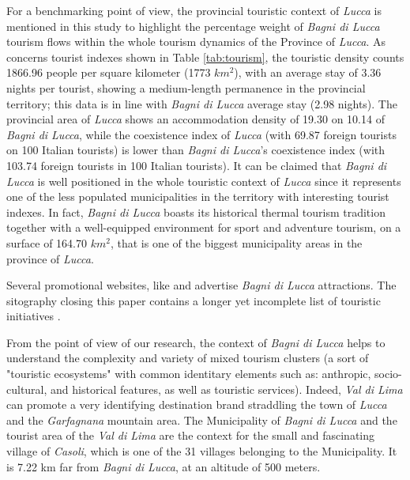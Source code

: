 \documentclass[sustainability,article,submit,pdftex,moreauthors]{Definitions/mdpi}
\begin{document}
For a benchmarking point of view, the provincial touristic context of \emph{Lucca} is mentioned in this study to highlight the percentage weight of \emph{Bagni di Lucca} tourism flows within the whole tourism dynamics of the Province of \emph{Lucca}. 
As concerns tourist indexes shown in Table \ref{tab:tourism}, the touristic density counts 1866.96 people per square kilometer (1773 $km^2$), with an average stay of 3.36 nights per tourist, showing a medium-length permanence in the provincial territory; this data is in line with \emph{Bagni di Lucca} average stay (2.98 nights). 
The provincial area of \emph{Lucca} shows an accommodation density of 19.30 on 10.14 of \emph{Bagni di Lucca}, while the coexistence index of \emph{Lucca} (with 69.87 foreign tourists on 100 Italian tourists) is lower than \emph{Bagni di Lucca}’s coexistence index (with 103.74 foreign tourists in 100 Italian tourists). 
It can be claimed that \emph{Bagni di Lucca} is well positioned in the whole touristic context of \emph{Lucca} since it represents one of the less populated municipalities in the territory with interesting tourist indexes. In fact, \emph{Bagni di Lucca} boasts its historical thermal tourism tradition together with a well-equipped environment for sport and adventure tourism, on a surface of 164.70 $km^2$, that is one of the biggest municipality areas in the province of \emph{Lucca}.

Several promotional websites, like  and  advertise \emph{Bagni di Lucca} attractions. The sitography closing this paper contains a longer yet incomplete list of touristic initiatives  .

From the point of view of our research, the context of \emph{Bagni di Lucca} helps to understand the complexity and variety of mixed tourism clusters (a sort of "touristic ecosystems" with common identitary elements such as: anthropic, socio-cultural, and historical features, as well as touristic services). Indeed, \emph{Val di Lima} can promote a very identifying destination brand straddling the town of \emph{Lucca} and the \emph{Garfagnana} mountain area. The Municipality of \emph{Bagni di Lucca} and the tourist area of the \emph{Val di Lima} are the context for the small and fascinating village of \emph{Casoli}, which is one of the 31 villages belonging to the Municipality. It is 7.22 km far from \emph{Bagni di Lucca}, at an altitude of 500 meters.
\end{document}
